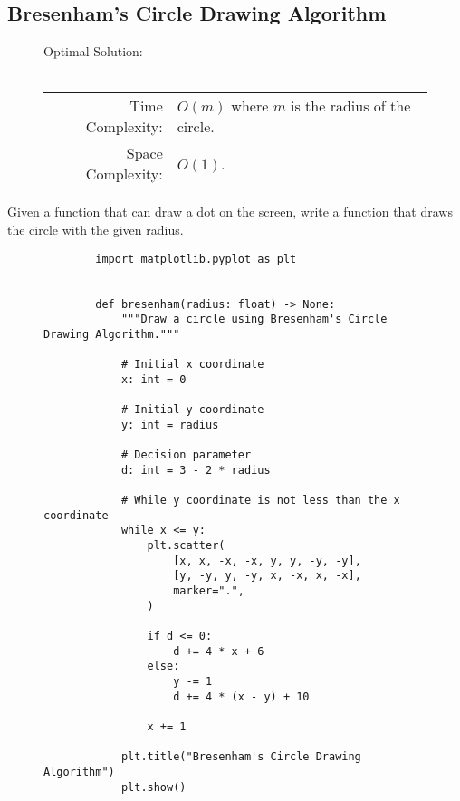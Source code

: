 
\subsection{Bresenham's Circle Drawing Algorithm}

\begin{figure}[H]
    Optimal Solution:\\\\
    \begin{tabular}{rl}
        Time Complexity:& \(O(m)\) where \(m\) is the radius of the circle.\\
        Space Complexity:& \(O(1)\).
    \end{tabular}
\end{figure}

Given a function that can draw a dot on the screen, write a function that draws
the circle with the given radius.

\begin{figure}[H]
    \centering
    \begin{verbatim}
        import matplotlib.pyplot as plt


        def bresenham(radius: float) -> None:
            """Draw a circle using Bresenham's Circle Drawing Algorithm."""

            # Initial x coordinate
            x: int = 0

            # Initial y coordinate
            y: int = radius

            # Decision parameter
            d: int = 3 - 2 * radius

            # While y coordinate is not less than the x coordinate
            while x <= y:
                plt.scatter(
                    [x, x, -x, -x, y, y, -y, -y],
                    [y, -y, y, -y, x, -x, x, -x],
                    marker=".",
                )

                if d <= 0:
                    d += 4 * x + 6
                else:
                    y -= 1
                    d += 4 * (x - y) + 10

                x += 1

            plt.title("Bresenham's Circle Drawing Algorithm")
            plt.show()
    \end{verbatim}
\end{figure}
